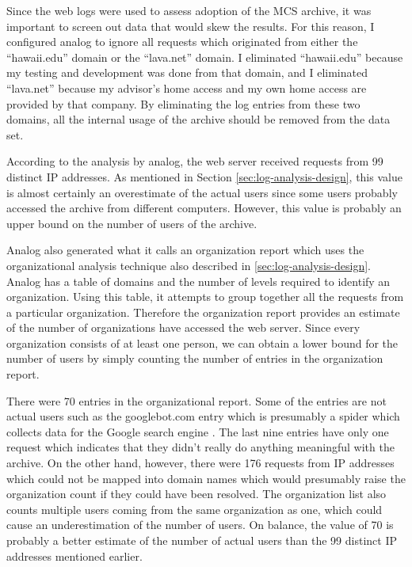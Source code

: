 Since the web logs were used to assess adoption of the MCS archive, it was
important to screen out data that would skew the results. For this reason, I
configured analog to ignore all requests which originated from either the
``hawaii.edu'' domain or the ``lava.net'' domain. I eliminated ``hawaii.edu''
because my testing and development was done from that domain, and I eliminated
``lava.net'' because my advisor's home access and my own home access are
provided by that company. By eliminating the log entries from these two
domains, all the internal usage of the archive should be removed from the data
set.

According to the analysis by analog, the web server received requests from 99
distinct IP addresses. As mentioned in Section \ref{sec:log-analysis-design},
this value is almost certainly an overestimate of the actual users since some
users probably accessed the archive from different computers. However, this
value is probably an upper bound on the number of users of the archive.

Analog also generated what it calls an organization report which uses the
organizational analysis technique also described in
\ref{sec:log-analysis-design}. Analog has a table of domains and the number of
levels required to identify an organization. Using this table, it attempts to
group together all the requests from a particular organization. Therefore the
organization report provides an estimate of the number of organizations have
accessed the web server. Since every organization consists of at least one
person, we can obtain a lower bound for the number of users by simply counting
the number of entries in the organization report.

There were 70 entries in the organizational report. Some of the entries are not
actual users such as the googlebot.com entry which is presumably a spider which
collects data for the Google search engine \cite{google-website}. The last nine
entries have only one request which indicates that they didn't really do
anything meaningful with the archive. On the other hand, however, there were
176 requests from IP addresses which could not be mapped into domain names
which would presumably raise the organization count if they could have been
resolved. The organization list also counts multiple users coming from the same
organization as one, which could cause an underestimation of the number of
users. On balance, the value of 70 is probably a better estimate of the number
of actual users than the 99 distinct IP addresses mentioned earlier.

